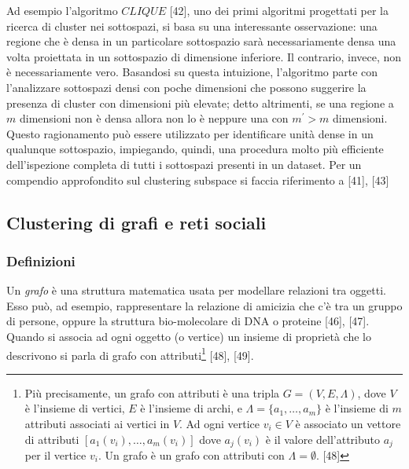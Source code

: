 Ad esempio l'algoritmo $ CLIQUE $ [42], uno dei primi algoritmi progettati per la ricerca di cluster nei sottospazi, si basa su una interessante osservazione: una regione che \`e densa in un particolare sottospazio sar\`a necessariamente densa una volta proiettata in un sottospazio di dimensione inferiore. Il contrario, invece, non \`e necessariamente vero. Basandosi su questa intuizione, l'algoritmo parte con l'analizzare sottospazi densi con poche dimensioni che possono suggerire la presenza di cluster con dimensioni pi\`u elevate; detto altrimenti, se una regione a $ m $ dimensioni non \`e densa allora non lo \`e neppure una con $ m^{'} > m $ dimensioni.
Questo ragionamento  pu\`o essere utilizzato per identificare unit\`a dense in un qualunque sottospazio, impiegando, quindi, una procedura molto pi\`u efficiente dell'ispezione completa di tutti i sottospazi presenti in un dataset.
Per un compendio approfondito sul clustering subspace si faccia riferimento a [41], [43]

\subsection{Clustering di grafi e reti sociali}
\subsubsection{Definizioni}
Un \textit{grafo} \`e una struttura matematica usata per modellare relazioni tra oggetti. Esso pu\`o, ad esempio, rappresentare la relazione di amicizia che c'\`e tra un gruppo di persone, oppure la struttura bio-molecolare di DNA o proteine [46], [47]. Quando si associa ad ogni oggetto (o vertice) un insieme di propriet\`a che lo descrivono si parla di grafo con attributi\footnote{ Pi\`u precisamente, un grafo con attributi \`e una tripla $ G = (V, E, \Lambda) $, dove $ V $ \`e l'insieme di vertici, $ E $ \`e l'insieme di archi, e $ \Lambda = \{ a_{1}, \dots, a_{m} \} $ \`e l'insieme di $ m $ attributi associati ai vertici in $ V $. Ad ogni vertice $ v_{i} \in V$  \`e associato un vettore di attributi $ [ a_{1}(v_{i}), \dots, a_{m}(v_{i})] $ dove $ a_{j}(v_{i}) $ \`e il valore dell'attributo $ a_{j} $ per il vertice $ v_{i} $. Un grafo \`e un grafo con attributi con $ \Lambda = \emptyset $. [48] }  [48], [49].

